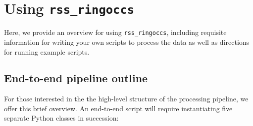 \documentclass[titlepage, 12pt]{article}
\begin{document}
    \section{Using \texttt{rss\_ringoccs}}
        Here, we provide an overview for using
        \texttt{rss\_ringoccs}, including requisite
        information for writing your own scripts to
        process the data as well as directions for running example scripts.
        \subsection{End-to-end pipeline outline}
            For those interested in the the high-level structure of the processing pipeline, we offer this brief overview. An end-to-end script will
            require instantiating five separate Python classes
            in succession:
\end{document}
